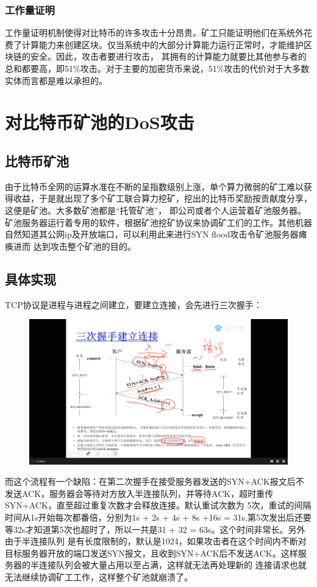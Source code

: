 \documentclass[UTF8,12pt]{article}
\begin{document}
\subsubsection{工作量证明}
工作量证明机制使得对比特币的许多攻击十分昂贵。矿工只能证明他们在系统外花费了计算能力来创建区块。仅当系统中的大部分计算能力运行正常时，才能维护区块链的安全。因此，攻击者要进行攻击，
其拥有的计算能力就要比其他参与者的总和都要高，即51\%攻击。对于主要的加密货币来说，51\%攻击的代价对于大多数实体而言都是难以承担的。
\section{对比特币矿池的DoS攻击}
\subsection{比特币矿池}
由于比特币全网的运算水准在不断的呈指数级别上涨，单个算力微弱的矿工难以获得收益，于是就出现了多个矿工联合算力挖矿，挖出的比特币奖励按贡献度分享，这便是矿池。大多数矿池都是“托管矿池”，
即公司或者个人运营着矿池服务器。矿池服务器运行着专用的软件，根据矿池挖矿协议来协调矿工们的工作。其他机器自然知道其公网ip及开放端口，可以利用此来进行SYN flood攻击令矿池服务器瘫痪进而
达到攻击整个矿池的目的。
\subsection{具体实现}
TCP协议是进程与进程之间建立，要建立连接，会先进行三次握手：
\begin{figure}[H]
    \centering
    \includegraphics[width = \textwidth]{shaking.png}
\end{figure}
而这个流程有一个缺陷：在第二次握手在接受服务器发送的SYN+ACK报文后不发送ACK，服务器会等待对方放入半连接队列，并等待ACK，超时重传SYN+ACK，直至超过重复次数才会释放连接。默认重试次数为
5次，重试的间隔时间从1s开始每次都番倍，分别为1s + 2s + 4s + 8s +16s = 31s,第5次发出后还要等32s才知道第5次也超时了，所以一共是31 + 32 = 63s。这个时间非常长。另外由于半连接队列
是有长度限制的，默认是1024，如果攻击者在这个时间内不断对目标服务器开放的端口发送SYN报文，且收到SYN+ACK后不发送ACK。这样服务器的半连接队列会被大量占用以至占满，这样就无法再处理新的
连接请求也就无法继续协调矿工工作，这样整个矿池就崩溃了。
\end{document}
